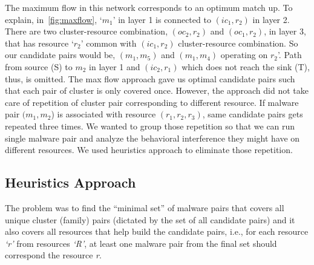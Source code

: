 The maximum flow in this network corresponds to an optimum match up.
To explain, in~\autoref{fig:maxflow}, `$m_1$' in layer 1 is connected to $(ic_1,r_2)$ in layer 2.
There are two cluster-resource combination, $(oc_2,r_2)$ and $(oc_1,r_2)$, in layer 3, that has resource `$r_2$' common with $(ic_1,r_2)$ cluster-resource combination.
So our candidate pairs would be, $(m_1,m_5)$ and $(m_1,m_4)$ operating on $r_2$'.
Path from source (S) to $m_2$ in layer 1 and $(ic_2,r_1)$ which does not reach the sink (T), thus, is omitted.
The max flow approach gave us optimal candidate pairs such that each pair of cluster is only covered once.
However, the approach did not take care of repetition of cluster pair corresponding to different resource.
If malware pair $(m_1,m_2$) is associated with resource $(r_1,r_2,r_3)$, same candidate pairs gets repeated three times.
We wanted to group those repetition so that we can run single malware pair and analyze the behavioral interference they might have on different resources.
We used heuristics approach to eliminate those repetition.
\subsection{Heuristics Approach}
\label{sub:Heuristics Approach}
The problem was to find the ``minimal set'' of malware pairs that covers all unique cluster (family) pairs (dictated by the set of all candidate pairs) and it also covers all resources that help build the candidate pairs, i.e., for each resource \emph{`r'} from resources \emph{`R'}, at least one malware pair from the final set should correspond the resource \emph{r}.\\

